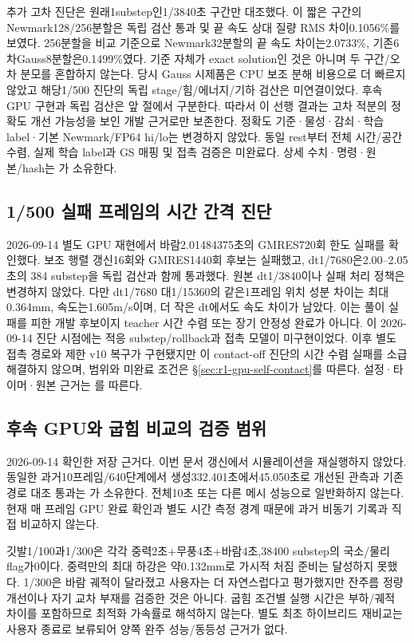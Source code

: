 \documentclass[10pt]{article}
\begin{document}
추가 고차 진단은 원래1substep인1/3840초 구간만 대조했다. 이 짧은 구간의
Newmark128/256분할은 독립 검산 통과 및 끝 속도 상대 질량 RMS 차이0.1056\%를 보였다.
256분할을 비교 기준으로 Newmark32분할의 끝 속도 차이는2.0733\%, 기존6차Gauss8분할은0.1499\%였다.
기준 자체가 exact solution인 것은 아니며 두 구간/오차 분모를 혼합하지 않는다.
당시 Gauss 시제품은 CPU 보조 분해 비용으로 더 빠르지 않았고 해당1/500 진단의 독립
stage/힘/에너지/기하 검산은 미연결이었다. 후속 GPU 구현과 독립 검산은 앞 절에서 구분한다.
따라서 이 선행 결과는 고차 적분의 정확도 개선 가능성을 보인 개발 근거로만 보존한다.
정확도 기준·물성·감쇠·학습 label·기본 Newmark/FP64 hi/lo는 변경하지 않았다.
동일 rest부터 전체 시간/공간 수렴, 실제 학습 label과 GS 매핑 및 접촉 검증은 미완료다.
상세 수치·명령·원본/hash는 가 소유한다.

\subsection{1/500 실패 프레임의 시간 간격 진단}
2026-09-14 별도 GPU 재현에서 바람2.01484375초의 GMRES720회 한도 실패를 확인했다.
보조 행렬 갱신16회와 GMRES1440회 후보는 실패했고, dt1/7680은2.00--2.05초의
384 substep을 독립 검산과 함께 통과했다. 원본 dt1/3840이나 실패 처리 정책은 변경하지 않았다.
다만 dt1/7680 대1/15360의 같은1프레임 위치 성분 차이는 최대0.364mm, 속도는1.605m/s이며,
더 작은 dt에서도 속도 차이가 남았다. 이는 풀이 실패를 피한 개발 후보이지 teacher 시간 수렴
또는 장기 안정성 완료가 아니다. 이 2026-09-14 진단 시점에는 적응 substep/rollback과 접촉 모델이
미구현이었다. 이후 별도 접촉 경로와 제한 v10 복구가 구현됐지만 이 contact-off 진단의 시간 수렴
실패를 소급 해결하지 않으며, 범위와 미완료 조건은 \S\ref{sec:r1-gpu-self-contact}를 따른다.
설정·타이머·원본 근거는 를 따른다.

\subsection{후속 GPU와 굽힘 비교의 검증 범위}
2026-09-14 확인한 저장 근거다. 이번 문서 갱신에서 시뮬레이션을 재실행하지 않았다.
동일한 과거10프레임/640단계에서 생성332.401초에서45.050초로 개선된 관측과
기존 경로 대조 통과는 가 소유한다.
전체10초 또는 다른 메시 성능으로 일반화하지 않는다. 현재 매 프레임 GPU 완료 확인과
별도 시간 측정 경계 때문에 과거 비동기 기록과 직접 비교하지 않는다.

깃발1/100과1/300은 각각 중력2초+무풍4초+바람4초,38400 substep의 국소/물리 flag가0이다.
중력만의 최대 하강은 약0.132mm로 가시적 처짐 준비는 달성하지 못했다.
1/300은 바람 궤적이 달라졌고 사용자는 더 자연스럽다고 평가했지만 잔주름 정량 개선이나
자기 교차 부재를 검증한 것은 아니다. 굽힘 조건별 실행 시간은 부하/궤적 차이를 포함하므로
최적화 가속률로 해석하지 않는다. 별도 최초 하이브리드 재비교는 사용자 종료로 보류되어
양쪽 완주 성능/동등성 근거가 없다.
\end{document}
